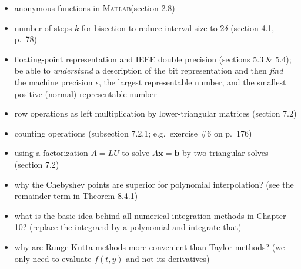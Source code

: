 \documentclass[12pt]{amsart}
\newcommand{\bb}{\mathbf{b}}
\newcommand{\bx}{\mathbf{x}}
\newcommand{\eps}{\epsilon}
\newcommand{\Matlab}{\textsc{Matlab}\xspace}
\begin{document}
  \begin{itemize}
  \item anonymous functions in \Matlab (section 2.8)
  \item number of steps $k$ for bisection to reduce interval size to $2\delta$ (section 4.1, p.~78)
  \item floating-point representation and IEEE double precision (sections 5.3 \& 5.4); be able to \emph{understand} a description of the bit representation and then \emph{find} the machine precision $\eps$, the largest representable number, and the smallest positive (normal) representable number
  \item row operations as left multiplication by lower-triangular matrices (section 7.2)
  \item counting operations (subsection 7.2.1; e.g.~exercise \#6 on p.~176)
  \item using a factorization $A=LU$ to solve $A\bx=\bb$ by two triangular solves (section 7.2)
  \item why the Chebyshev points are superior for polynomial interpolation? (see the remainder term in Theorem 8.4.1)
  \item what is the basic idea behind all numerical integration methods in Chapter 10?  (replace the integrand by a polynomial and integrate that)
  \item why are Runge-Kutta methods more convenient than Taylor methods? (we only need to evaluate $f(t,y)$ and not its derivatives)
  \end{itemize}
\end{document}
